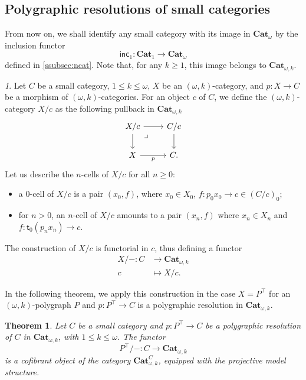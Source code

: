 \documentclass[reqno]{amsart}
\theoremstyle{plain}
\newtheorem{theorem}[subsubsection]{Theorem}
\theoremstyle{definition}
\theoremstyle{remark}
\newtheorem{paragr}[subsubsection]{} %
\newcommand{\pair}[2]{(#1,#2)}       %
\newcommand{\target}{\mathsf{t}} %
\newcommand{\tr}[2]{#1/#2} %
\newcommand{\ctg}[1]{\mathbf{#1}}  %
\newcommand{\Cat}{\ctg{Cat}}   %
\newcommand{\nCat}[1]{\Cat_{#1}}  %
\newcommand{\opCat}[1]{\Cat_{\omega,#1}} %
\newcommand{\funopCat}[2]{\Cat_{\omega,#1}^{#2}} %
\newcommand{\oCat}{\nCat{\omega}} %
\newcommand{\functor}[1]{\mathsf{#1}} %
\newcommand{\inc}[2]{\functor{inc}_{#1}^{#2}}%
\newcommand{\oinc}[1]{\inc{#1}{}}%
\newcommand{\tge}[1]{\target_{#1}} %
\newcommand{\frgp}[1]{#1^\top} %
\newcommand{\oo}{\ensuremath{\omega}}
\newcommand{\ook}[1]{\ensuremath{\pair{\omega}{#1}}}
\newcommand{\nbd}{\nobreakdash} %
\begin{document}
\subsection{Polygraphic resolutions of small categories}\label{subsec:polres}

From now on, we shall identify any small category with its image
in $\oCat$ by the inclusion functor \[\oinc 1\colon\nCat 1\to \oCat\]
defined in \ref{ssubsec:ncat}. Note that, for any $k\geq 1$, this
image belongs to $\opCat k$. 
\begin{paragr}\label{paragr:pullback_resol}
  Let $C$ be a small category, $1\leq k \leq \oo$, $X$ be an $\ook
  k$\nbd-category, and $p \colon X \to C$ be a morphism of $\ook k$\nbd-categories. For an object $c$ of $C$, we define the $\ook k$\nbd-category $\tr{X}{c}$ as the following pullback in $\opCat{k}$
  \begin{equation}
  \label{eq:pullback}
  \begin{tikzcd}
      \tr{X}{c} \ar[d] \ar[r] & \tr{C}{c} \ar[d] \\
       X \ar[r,"p"'] & C.
      \ar[from=1-1,to=2-2,phantom,"\lrcorner",very near start]
    \end{tikzcd}
  \end{equation} 
  Let us describe the $n$-cells of $\tr{X}{c}$
  for all $n\geq 0$:
  \begin{itemize}
  \item a $0$-cell of $\tr{X}{c}$ is a pair $\pair{x_0}{f}$,
    where $x_0\in X_0$, $f\colon p_0x_0\to c\in (\tr Cc)_0$;
  \item for $n>0$, an $n$-cell of $\tr{X}{c}$ amounts to a
    pair $\pair{x_n}{f}$ where  $x_n\in X_n$ and $f:\tge 0
    (p_nx_n)\to c$.
  \end{itemize}
The construction of $\tr{X}{c}$ is functorial in $c$, thus defining a functor
  \[
    \begin{aligned}
      \tr{X}{-} \colon C &\to \opCat{k} \\
      c &\mapsto \tr{X}{c}.
    \end{aligned}
  \]
\end{paragr}
In the following theorem, we apply this construction in the case
$X=\frgp P$ for an $\ook k$-polygraph $P$ and $p \colon \frgp P \to C$
is a polygraphic resolution in $\opCat k$.
\begin{theorem}\label{thm:projresol}
    Let $C$ be a small category and $p:\frgp P\to C$ be a polygraphic
    resolution of $C$ in $\opCat k$, with $1\leq k\leq\oo$. The functor
    \[\tr{\frgp P\!}{-}:C\to \opCat k\]
    is a cofibrant object of the category $\funopCat{k}{C}$, equipped with the projective model structure.
\end{theorem}
\end{document}
